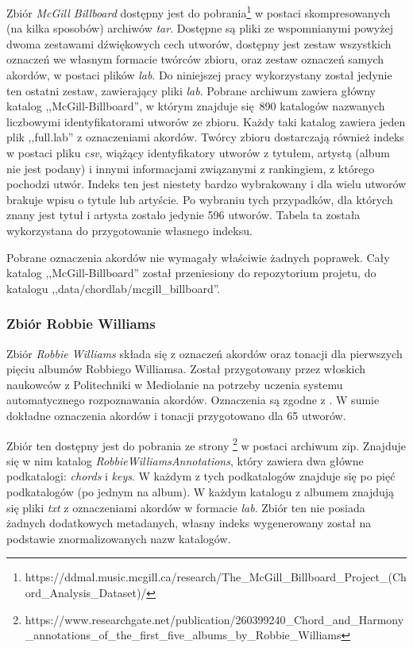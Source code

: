 Zbiór \emph{McGill Billboard} dostępny jest do
pobrania\footnote{https://ddmal.music.mcgill.ca/research/The\_McGill\_Billboard\_Project\_(Chord\_Analysis\_Dataset)/}
w postaci skompresowanych (na kilka sposobów) archiwów \emph{tar}. Dostępne są pliki ze wspomnianymi
powyżej dwoma zestawami dźwiękowych cech utworów, dostępny jest zestaw wszystkich oznaczeń we
własnym formacie twórców zbioru, oraz zestaw oznaczeń samych akordów, w postaci plików \emph{lab}.
Do niniejszej pracy wykorzystany został jedynie ten ostatni zestaw, zawierający pliki \emph{lab}. Pobrane
archiwum zawiera główny katalog ,,McGill-Billboard'', w którym znajduje się 890 katalogów nazwanych
liczbowymi identyfikatorami utworów ze zbioru. Każdy taki katalog zawiera jeden plik ,,full.lab'' z
oznaczeniami akordów. Twórcy zbioru dostarczają również indeks w postaci pliku \emph{csv}, wiążący
identyfikatory utworów z tytułem, artystą (album nie jest podany) i innymi informacjami związanymi z
rankingiem, z którego pochodzi utwór. Indeks ten jest niestety bardzo wybrakowany i dla wielu
utworów brakuje wpisu o tytule lub artyście. Po wybraniu tych przypadków, dla których znany jest
tytuł i artysta zostało jedynie 596 utworów. Tabela ta została wykorzystana do przygotowanie
własnego indeksu.

Pobrane oznaczenia akordów nie wymagały właściwie żadnych poprawek. Cały katalog
,,McGill-Billboard'' został przeniesiony do repozytorium projetu, do katalogu
,,data/chordlab/mcgill\_billboard''.

\subsubsection{Zbiór Robbie Williams}

Zbiór \emph{Robbie Williams} \cite{giorgi_automatic_2013} składa się z oznaczeń akordów oraz tonacji
dla pierwszych pięciu albumów Robbiego Williamsa. Został przygotowany przez włoskich naukowców z
Politechniki w Mediolanie na potrzeby uczenia systemu automatycznego rozpoznawania akordów.
Oznaczenia są zgodne z \cite{harte_towards_nodate}. W sumie dokładne oznaczenia akordów i tonacji
przygotowano dla 65 utworów.

Zbiór ten dostępny jest do pobrania ze strony
\footnote{https://www.researchgate.net/publication/260399240\_Chord\_and\_Harmony\_annotations\_of\_the\_first\_five\_albums\_by\_Robbie\_Williams}
w postaci archiwum zip. Znajduje się w nim katalog \emph{RobbieWilliamsAnnotations}, który zawiera
dwa główne podkatalogi: \emph{chords} i \emph{keys}. W każdym z tych podkatalogów znajduje się po pięć
podkatalogów (po jednym na album). W każdym katalogu z albumem znajdują się pliki \emph{txt} z
oznaczeniami akordów w formacie \emph{lab}. Zbiór ten nie posiada żadnych dodatkowych metadanych,
własny indeks wygenerowany został na podstawie znormalizowanych nazw katalogów.

